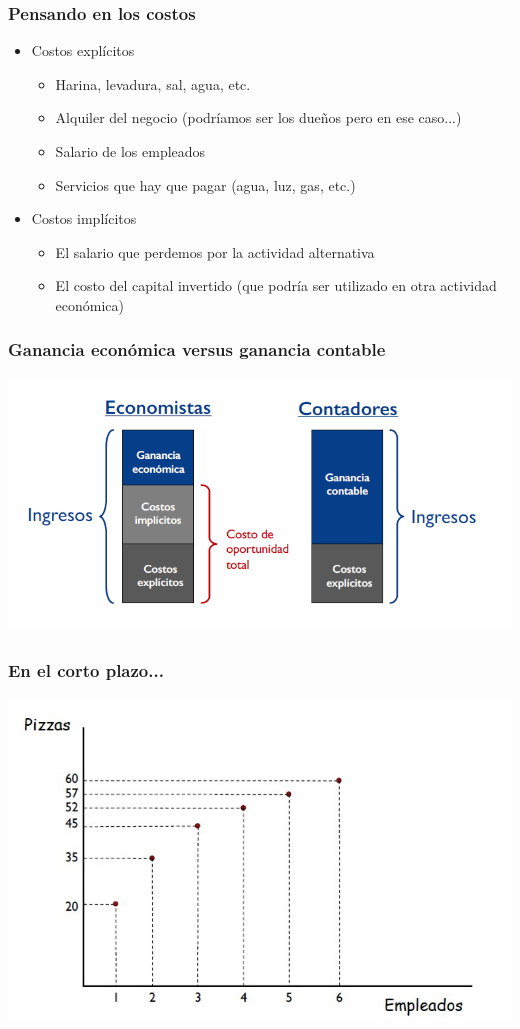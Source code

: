 \documentclass{beamer}
\begin{document}
\begin{frame}
\frametitle{Pensando en los costos}
\begin{itemize}
    \item Costos explícitos
    \begin{itemize}
        \item Harina, levadura, sal, agua, etc.
        \item Alquiler del negocio (podríamos ser los dueños pero en ese caso...)
        \item Salario de los empleados 
        \item Servicios que hay que pagar (agua, luz, gas, etc.)
    \end{itemize}
    \item Costos implícitos
    \begin{itemize}
        \item El salario que perdemos por la actividad alternativa
        \item El costo del capital invertido (que podría ser utilizado en otra actividad económica)
    \end{itemize}
\end{itemize}
\end{frame}

\begin{frame}
\frametitle{Ganancia económica versus ganancia contable}
\centering
\includegraphics[scale=0.6]{Figures/Tema_06.13_beneficioeconomicovscontable.png}
\end{frame}

\begin{frame}
\frametitle{ En el corto plazo...}
\centering
\includegraphics[scale=0.6]{Figures/Tema_06.14_funciondeproduccionmedialunas.jpg}
\end{frame}
\end{document}
